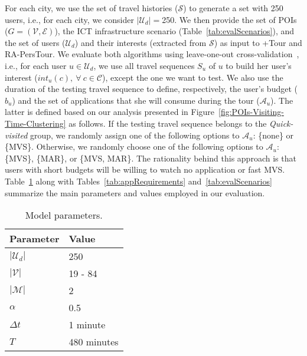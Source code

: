 For each city, we use the set of travel histories ($\mathcal{S}$) to generate a set with 250 users, i.e., for each city, we consider $|\mathcal{U}_d|=$250. We then provide the set of POIs ($G = (\mathcal{V},\mathcal{E})$), the ICT infrastructure scenario (Table~\ref{tab:evalScenarios}), and the set of users ($\mathcal{U}_d$) and their interests (extracted from $\mathcal{S}$) as input to +Tour and RA-PersTour. We evaluate both algorithms using leave-one-out cross-validation~\cite{kohavi:95}, i.e., for each user $u \in \mathcal{U}_d$, we use all travel sequences $S_u$ of $u$ to build her user's interest ($int_{u}(c), \ \forall \ c \in \mathcal{C}$), except the one we want to test. We also use the duration of the testing travel sequence to define, respectively, the user's budget ($b_u$) and the set of applications that she will consume during the tour ($\mathcal{A}_{u}$). The latter is defined based on our analysis presented in Figure~\ref{fig:POIs-Visiting-Time-Clustering} as follows. If the testing travel sequence belongs to the \textit{Quick-visited} group, we randomly assign one of the following options to $\mathcal{A}_{u}$: \{none\} or \{{MVS}\}. Otherwise, we randomly choose one of the following options to $\mathcal{A}_{u}$: \{{MVS}\}, \{{MAR}\}, or \{{MVS}, {MAR}\}. The rationality behind this approach is that users with short budgets will be willing to watch no application or fast {MVS}. Table~\ref{tab:modelParameters} along with Tables~\ref{tab:appRequirements} and~\ref{tab:evalScenarios} summarize the main parameters and values employed in our evaluation.

\begin{table}[htb]
\footnotesize
\centering
\caption{Model parameters.}
\label{tab:modelParameters}
\begin{tabular}{ll}
\hline
\textbf{Parameter} & \textbf{Value} \\ \hline
$|\mathcal{U}_d|$ & 250  \\
$|\mathcal{V}|$ & 19 - 84 \\ 
$|\mathcal{M}|$ & 2 \\ 
$\alpha$ & 0.5  \\
$\Delta{t}$ & 1 minute \\
$T$ & 480 minutes \\
\hline
\end{tabular}
\end{table}

